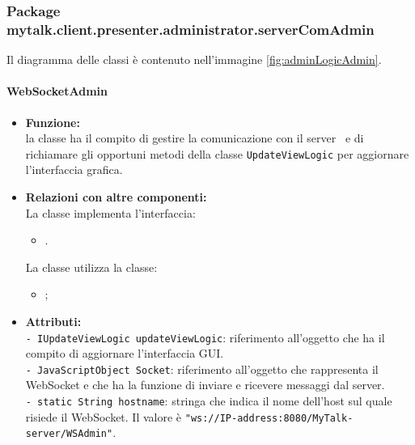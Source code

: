 {{\begin{sloppypar}
{{\begin{itemize}
{					
				}
			\end{itemize}
		}
	}
	
	\subsubsection{Package mytalk.client.presenter.administrator.serverComAdmin}{
	Il diagramma delle classi è contenuto nell'immagine \ref{fig:adminLogicAdmin}.
	
		\paragraph{WebSocketAdmin}\label{par:WebSocketAdmin}{
			\begin{itemize}
				\item[] \textbf{Funzione:}\\
				la classe ha il compito di gestire la comunicazione con il server\g~ e di richiamare gli opportuni metodi della classe \texttt{UpdateViewLogic} per aggiornare l'interfaccia grafica.\\
			
				\item[] \textbf{Relazioni con altre componenti:}\\
					La classe implementa l'interfaccia:
					\begin{itemize}
						\item[] .
					\end{itemize}
					La classe utilizza la classe:
					\begin{itemize}
						\item[] ;
					\end{itemize}
				
				\item[] \textbf{Attributi:}{\\
					\texttt{- IUpdateViewLogic updateViewLogic}: riferimento all'oggetto che ha il compito di aggiornare l'interfaccia GUI\g.\\
					
					\texttt{- JavaScriptObject Socket}: riferimento all'oggetto che rappresenta il WebSocket e che ha la funzione di inviare e ricevere messaggi dal server\g.\\
					
					\texttt{- static String hostname}: stringa che indica il nome dell'host sul quale risiede il WebSocket. Il valore è \texttt{"ws://{IP-address}:8080/MyTalk-server/WSAdmin"}.\\
					
}
\end{itemize}}}
\end{sloppypar}}}
